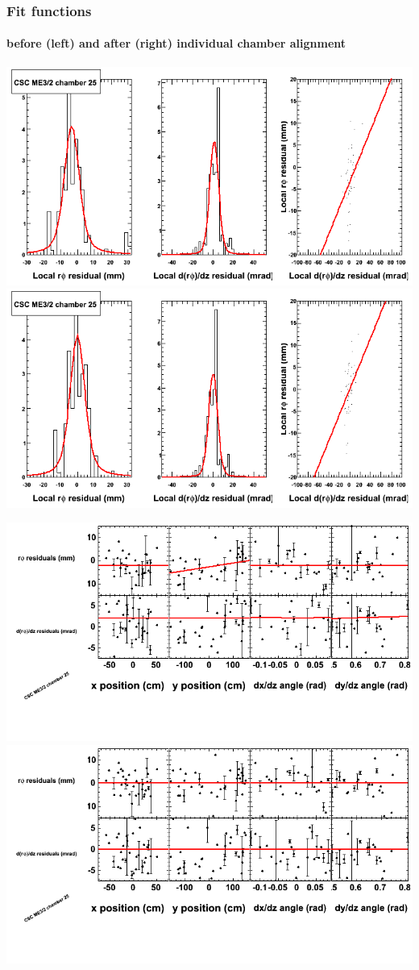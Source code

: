 \documentclass[compress]{beamer}
\begin{document}
\begin{frame}
\frametitle{Fit functions}
\framesubtitle{before (left) and after (right) individual chamber alignment}
\includegraphics[width=0.5\linewidth]{ringfits_3dof/beforefit_MEp32_25_bellcurve.png} \includegraphics[width=0.5\linewidth]{ringfits_3dof/afterfit_MEp32_25_bellcurve.png}

\includegraphics[width=0.5\linewidth]{ringfits_3dof/beforefit_MEp32_25_polynomials.png} \includegraphics[width=0.5\linewidth]{ringfits_3dof/afterfit_MEp32_25_polynomials.png}
\end{frame}
\end{document}
